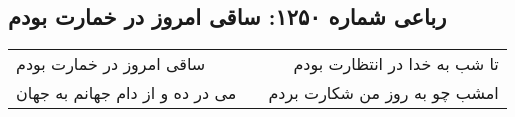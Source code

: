 \begin{center}
\section*{رباعی شماره ۱۲۵۰: ساقی امروز در خمارت بودم}
\label{sec:1250}
\begin{longtable}{l p{0.5cm} r}
ساقی امروز در خمارت بودم
&&
تا شب به خدا در انتظارت بودم
\\
می در ده و از دام جهانم به جهان
&&
امشب چو به روز من شکارت بردم
\\
\end{longtable}
\end{center}
